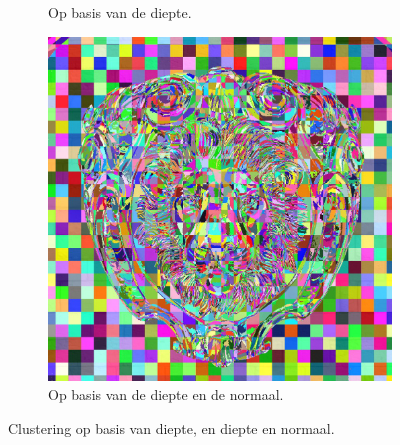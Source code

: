 \begin{figure}[tb]
\begin{subfigure}[b]{0.32\textwidth}
    \caption{Op basis van de diepte.}
    \label{fig:cs-opdeling-voorbeeld:depth}
  \end{subfigure}%
  \begin{subfigure}[b]{0.32\textwidth}
    \includegraphics[width=\textwidth]{./img/raw/cs-opdeling-voorbeeld/normal.png}
    \caption{Op basis van de diepte en de normaal.}
    \label{fig:cs-opdeling-voorbeeld:normaal}
  \end{subfigure}
  \caption{Clustering op basis van diepte, en diepte en normaal\cite{olsson2012clustered}.}
  \label{fig:cs-opdeling-voorbeeld}
\end{figure}
